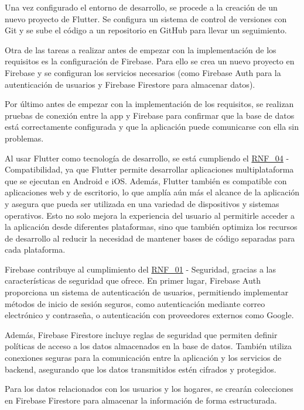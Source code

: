 Una vez configurado el entorno de desarrollo, se procede a la creación de un nuevo proyecto de Flutter.
Se configura un sistema de control de versiones con Git y se sube el código a un repositorio en GitHub para llevar un seguimiento. 

Otra de las tareas a realizar antes de empezar con la implementación de los requisitos es la configuración de Firebase.
Para ello se crea un nuevo proyecto en Firebase y se configuran los servicios necesarios (como Firebase Auth para la autenticación de usuarios y Firebase Firestore para almacenar datos).

Por último antes de empezar con la implementación de los requisitos, se realizan pruebas de conexión entre la app y Firebase para confirmar
que la base de datos está correctamente configurada y que la aplicación puede comunicarse con ella sin problemas. 

Al usar Flutter como tecnología de desarrollo, se está cumpliendo el {\hyperref[req:RNF_04]{RNF\_04}} - Compatibilidad, 
ya que Flutter permite desarrollar aplicaciones multiplataforma que se ejecutan en Android e iOS. Además, Flutter también 
es compatible con aplicaciones web y de escritorio, lo que amplía aún más el alcance de la aplicación y asegura que pueda 
ser utilizada en una variedad de dispositivos y sistemas operativos. Esto no solo mejora la experiencia del usuario al 
permitirle acceder a la aplicación desde diferentes plataformas, sino que también optimiza los recursos de desarrollo al 
reducir la necesidad de mantener bases de código separadas para cada plataforma.

Firebase contribuye al cumplimiento del {\hyperref[req:RNF_01]{RNF\_01}} - Seguridad, gracias a las características de seguridad que ofrece. 
En primer lugar, Firebase Auth proporciona un sistema de autenticación de usuarios, permitiendo implementar métodos de inicio de sesión seguros, 
como autenticación mediante correo electrónico y contraseña, o autenticación con proveedores externos como Google. 

Además, Firebase Firestore incluye reglas de seguridad que permiten definir políticas de acceso a los datos almacenados en la base de datos.
También utiliza conexiones seguras para la comunicación entre la aplicación y los servicios de backend, asegurando que los datos transmitidos 
estén cifrados y protegidos.

Para los datos relacionados con los usuarios y los hogares, se crearán colecciones en Firebase Firestore para almacenar la información de forma estructurada.

